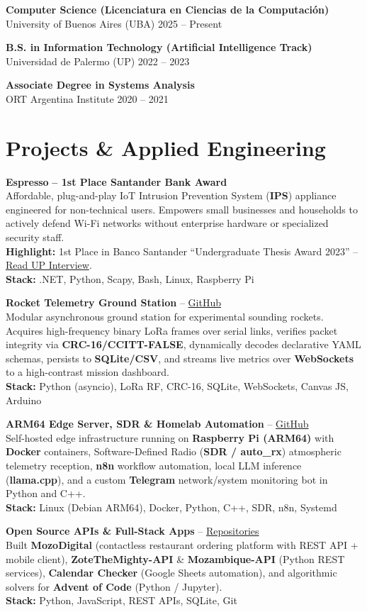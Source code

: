 \documentclass[10pt,a4paper]{article}
\newcommand{\cvedu}[3]{
  {\small\bfseries\color{darktext}#1}\\[1pt]
  {\footnotesize\color{primary}#2} \hfill {\footnotesize\color{mutedtext}#3}\vspace{4pt}
}
\newcommand{\cvproject}[4]{
  {\small\bfseries\color{darktext}#1} {\footnotesize #2}\\[1.5pt]
  {\footnotesize\color{darktext}#3}\\[1.5pt]
  {\footnotesize\textbf{\color{primary}Stack:} \color{mutedtext}#4}\vspace{5pt}
}
\begin{document}
\begin{minipage}[t]{11.9cm}
\cvedu{Computer Science (Licenciatura en Ciencias de la Computación)}{University of Buenos Aires (UBA)}{2025 -- Present}

\cvedu{B.S. in Information Technology (Artificial Intelligence Track)}{Universidad de Palermo (UP)}{2022 -- 2023}

\cvedu{Associate Degree in Systems Analysis}{ORT Argentina Institute}{2020 -- 2021}

\section{Projects \& Applied Engineering}

\cvproject{Espresso}{\textcolor{accent}{\textbf{-- 1st Place Santander Bank Award}}}{
  Affordable, plug-and-play IoT Intrusion Prevention System (\textbf{IPS}) appliance engineered for non-technical users. Empowers small businesses and households to actively defend Wi-Fi networks without enterprise hardware or specialized security staff.\\
  \textbf{Highlight:} 1st Place in Banco Santander ``Undergraduate Thesis Award 2023'' -- \href{https://www.palermo.edu/ingenieria/alumnos-protagonistas/matias-picon.html}{Read UP Interview}.
}{.NET, Python, Scapy, Bash, Linux, Raspberry Pi}

\cvproject{Rocket Telemetry Ground Station}{-- \href{https://github.com/Invenciones-Espaciales/estacion-terrena-pc}{GitHub}}{
  Modular asynchronous ground station for experimental sounding rockets. Acquires high-frequency binary LoRa frames over serial links, verifies packet integrity via \textbf{CRC-16/CCITT-FALSE}, dynamically decodes declarative YAML schemas, persists to \textbf{SQLite/CSV}, and streams live metrics over \textbf{WebSockets} to a high-contrast mission dashboard.
}{Python (asyncio), LoRa RF, CRC-16, SQLite, WebSockets, Canvas JS, Arduino}

\cvproject{ARM64 Edge Server, SDR \& Homelab Automation}{-- \href{https://github.com/x7reme13}{GitHub}}{
  Self-hosted edge infrastructure running on \textbf{Raspberry Pi (ARM64)} with \textbf{Docker} containers, Software-Defined Radio (\textbf{SDR / auto\_rx}) atmospheric telemetry reception, \textbf{n8n} workflow automation, local LLM inference (\textbf{llama.cpp}), and a custom \textbf{Telegram} network/system monitoring bot in Python and C++.
}{Linux (Debian ARM64), Docker, Python, C++, SDR, n8n, Systemd}

\cvproject{Open Source APIs \& Full-Stack Apps}{-- \href{https://github.com/x7reme13?tab=repositories}{Repositories}}{
  Built \textbf{MozoDigital} (contactless restaurant ordering platform with REST API + mobile client), \textbf{ZoteTheMighty-API} \& \textbf{Mozambique-API} (Python REST services), \textbf{Calendar Checker} (Google Sheets automation), and algorithmic solvers for \textbf{Advent of Code} (Python / Jupyter).
}{Python, JavaScript, REST APIs, SQLite, Git}

\end{minipage}%
\end{document}
